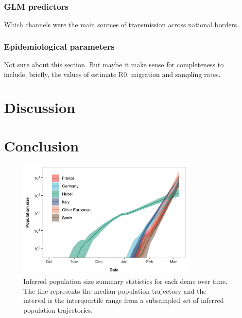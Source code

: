 \documentclass[12pt,]{article}
\begin{document}

\subsubsection*{GLM predictors}
Which channels were the main sources of transmission across national borders.

\subsubsection*{Epidemiological parameters}

Not sure about this section. But maybe it make sense for completeness to include, briefly, the values of estimate R0, migration and sampling rates.


\section*{Discussion}

\section*{Conclusion}


\begin{figure}[ht]
    \centering
    \includegraphics[width=0.8\textwidth]{201014_europe2_figtraj01.png}
    \caption{Inferred population size summary statistics for each deme over time. The line represents the median population trajectory and the interval is the interquartile range from a subsampled set of inferred population trajectories.}
    \label{fig:gribbon}
\end{figure}
\end{document}
